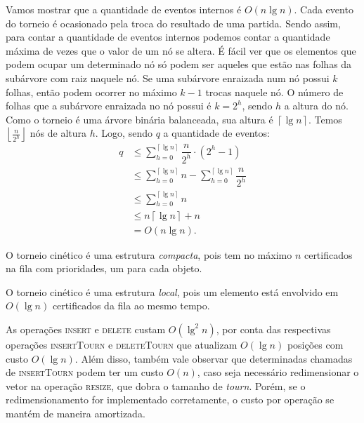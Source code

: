 Vamos mostrar que a quantidade de eventos internos é $O(n\lg{n})$.
Cada evento do torneio é ocasionado pela troca do resultado de uma partida.
Sendo assim, para contar a quantidade de eventos internos podemos contar a quantidade máxima de
vezes que o valor de um nó se altera.
É fácil ver que os elementos que podem ocupar um determinado nó só podem ser aqueles que estão nas
folhas da subárvore com raiz naquele nó.
Se uma subárvore enraizada num nó possui $k$ folhas, então podem ocorrer no máximo $k-1$ trocas
naquele nó.
O número de folhas que a subárvore enraizada no nó possui é $k = 2^h$, sendo $h$ a altura do nó.
Como o torneio é uma árvore binária balanceada, sua altura é $\left\lceil \lg{n}\right\rceil$.
Temos $\left\lfloor \frac{n}{2^h}\right\rfloor$ nós de altura $h$.
Logo, sendo $q$ a quantidade de eventos:
\begin{align*}
    q & \leq \displaystyle\sum_{h = 0}^{\left\lceil \lg{n}\right\rceil} \dfrac{n}{2^h}\cdot (2^h -
    1) \\\nonumber
    & \leq \displaystyle\sum_{h = 0}^{\left\lceil \lg{n}\right\rceil} n - \displaystyle\sum_{h =
    0}^{\left\lceil \lg{n}\right\rceil} \dfrac{n}{2^h} \\ \nonumber
    & \leq \displaystyle\sum_{h = 0}^{\left\lceil \lg{n}\right\rceil} n \\ \nonumber
    & \leq n\left\lceil \lg{n}\right\rceil + n \\\nonumber
    & = O(n \lg{n}).\nonumber
\end{align*}

O torneio cinético é uma estrutura \textit{compacta}, pois tem no máximo $n$
certificados na fila com prioridades, um para cada objeto.

O torneio cinético é uma estrutura \textit{local}, pois um elemento está envolvido
em $O(\lg{n})$ certificados da fila ao mesmo tempo.

As operações \textsc{insert} e \textsc{delete} custam $O(\lg^2{n})$, por conta das
respectivas operações \textsc{insertTourn} e \textsc{deleteTourn} que atualizam
$O(\lg{n})$ posições com custo $O(\lg{n})$.
Além disso, também vale observar que determinadas chamadas de \textsc{insertTourn} podem ter um
custo $O(n)$, caso seja necessário redimensionar o vetor na operação \textsc{resize}, que dobra o
tamanho de \textit{tourn}.
Porém, se o redimensionamento for implementado corretamente, o custo por operação se mantém de
maneira amortizada.


